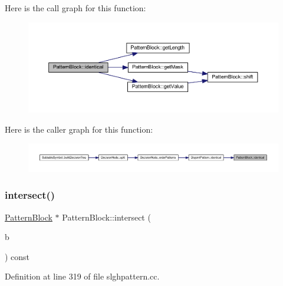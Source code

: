 Here is the call graph for this function\+:
\nopagebreak
\begin{figure}[H]
\begin{center}
\leavevmode
\includegraphics[width=350pt]{class_pattern_block_aeeb525d6c26f61b7717a7b6c0092ae67_cgraph}
\end{center}
\end{figure}
Here is the caller graph for this function\+:
\nopagebreak
\begin{figure}[H]
\begin{center}
\leavevmode
\includegraphics[width=350pt]{class_pattern_block_aeeb525d6c26f61b7717a7b6c0092ae67_icgraph}
\end{center}
\end{figure}
\mbox{\label{class_pattern_block_adc250100118cebc54285e1e3ea038fb3}} 
\subsubsection{\texorpdfstring{intersect()}{intersect()}}
{\footnotesize\ttfamily \mbox{\hyperlink{class_pattern_block}{Pattern\+Block}} $\ast$ Pattern\+Block\+::intersect (\begin{DoxyParamCaption}\item[{const \mbox{\hyperlink{class_pattern_block}{Pattern\+Block}} $\ast$}]{b }\end{DoxyParamCaption}) const}



Definition at line 319 of file slghpattern.\+cc.

